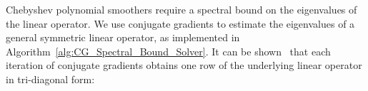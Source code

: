 %
Chebyshev polynomial smoothers require a spectral bound on the
eigenvalues of the linear operator. We use conjugate gradients to estimate the eigenvalues of a general symmetric linear operator, as implemented in Algorithm~\ref{alg:CG_Spectral_Bound_Solver}.  It can be shown~\cite{scales1989use} that each iteration of conjugate gradients obtains one row of the underlying linear operator in tri-diagonal form:

